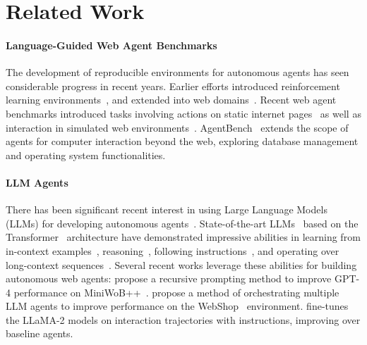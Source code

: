 \section{Related Work}

\paragraph{Language-Guided Web Agent Benchmarks}
The development of reproducible environments for autonomous agents has seen considerable progress in recent years. Earlier efforts introduced reinforcement learning environments~\citep{brockman2016openai}, and extended into web domains~\citep{shi2017world,liu2018reinforcement}. %
Recent web agent benchmarks introduced tasks involving actions on static internet pages~\citep{deng2023mind2web} as well as interaction in simulated web environments~\citep{yao2022webshop, zhou2023webarena}. AgentBench~\citep{liu2023agentbench} extends the scope of agents for computer interaction beyond the web, exploring database management and operating system functionalities. 


\paragraph{LLM Agents}
There has been significant recent interest in using Large Language Models (LLMs) for developing autonomous agents~\citep{xi2023rise,wang2023survey}. State-of-the-art LLMs~\citep{team2023gemini,openai2023gpt4,chowdhery2023palm,rae2021gopher,zhang2022opt,touvron2023llama,touvron2023llama2,jiang2023mistral,jiang2024mixtral} based on the Transformer~\citep{vaswani2017attention} architecture have demonstrated impressive abilities in learning from in-context examples~\citep{brown2020language,chan2022transformers}, reasoning~\citep{wei2022chain,yao2023tree,wang2022self,besta2023graph}, following instructions~\citep{chung2022scaling,longpre2023flan,ouyang2022training}, and operating over long-context sequences~\citep{tay2020long,bertsch2023unlimiformer,tworkowski2023focused}. Several recent works leverage these abilities for building autonomous web agents: \citet{kim2023language} propose a recursive prompting method to improve GPT-4 performance on MiniWoB++~\citep{liu2018reinforcement}. \citet{liu2023bolaa} propose a method of orchestrating multiple LLM agents to improve performance on the WebShop~\citep{yao2022webshop} environment. \citet{zeng2023agenttuning} fine-tunes the LLaMA-2 models on interaction trajectories with instructions, improving over baseline agents.

